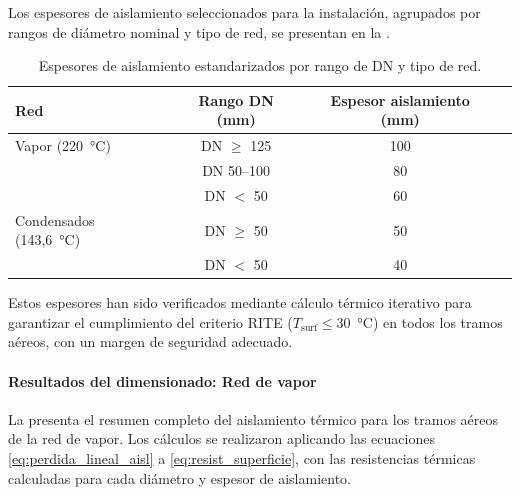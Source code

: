 \documentclass[12pt]{article}
\begin{document}
Los espesores de aislamiento seleccionados para la instalación, agrupados por rangos de diámetro nominal y tipo de red, se presentan en la .

\begin{table}[htbp]
	\centering
	\caption{Espesores de aislamiento estandarizados por rango de DN y tipo de red.}
	\label{tab:rangos_estandarizados}
	\begin{tabular}{lccc}
		\toprule
		\textbf{Red}             & \textbf{Rango DN (mm)} & \textbf{Espesor aislamiento (mm)} \\
		\midrule
		Vapor (220~°C)           & DN $\geq$ 125          & 100                               \\
		                         & DN 50--100             & 80                                \\
		                         & DN $<$ 50              & 60                                \\
		\midrule
		Condensados (143{,}6~°C) & DN $\geq$ 50           & 50                                \\
		                         & DN $<$ 50              & 40                                \\
		\bottomrule
	\end{tabular}
\end{table}

Estos espesores han sido verificados mediante cálculo térmico iterativo para garantizar el cumplimiento del criterio RITE ($T_{\text{surf}} \leq 30$~°C) en todos los tramos aéreos, con un margen de seguridad adecuado.

\paragraph{Resultados del dimensionado: Red de vapor}
\label{par:resultados_vapor_aereo}

La  presenta el resumen completo del aislamiento térmico para los tramos aéreos de la red de vapor. Los cálculos se realizaron aplicando las ecuaciones \eqref{eq:perdida_lineal_aisl} a \eqref{eq:resist_superficie}, con las resistencias térmicas calculadas para cada diámetro y espesor de aislamiento.
\end{document}
